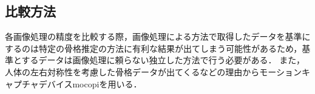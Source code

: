 \documentclass[titlepage]{jarticle}
\begin{document}


%
%
%

%
%
\subsection{比較方法}
%
各画像処理の精度を比較する際，画像処理による方法で取得したデータを基準にするのは特定の骨格推定の方法に有利な結果が出てしまう可能性があるため，基準とするデータは画像処理に頼らない独立した方法で行う必要がある．
また，人体の左右対称性を考慮した骨格データが出てくるなどの理由からモーションキャプチャデバイスmocopi\cite{mocopi}を用いる．

\end{document}
